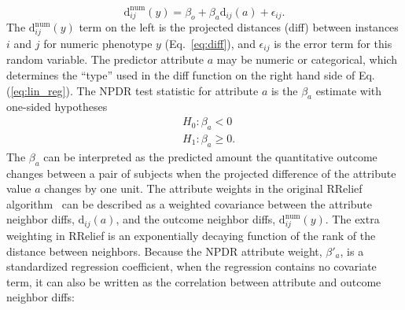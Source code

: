 \documentclass[10pt]{article}
\begin{document}

%
%
\begin{equation}\label{eq:lin_reg}
    \text{d}^{\text{num}}_{ij}(y) = \beta_{o} + \beta_{a} \text{d}_{ij}(a) + \epsilon_{ij}.
\end{equation}
The $\text{d}^{\text{num}}_{ij}(y)$ term on the left is the projected distances (diff) between instances $i$ and $j$ for numeric phenotype $y$ (Eq.~\ref{eq:diff}), and $\epsilon_{ij}$ is the error term for this random variable. The predictor attribute $a$ may be numeric or categorical, which determines the ``type'' used in the diff function on the right hand side of Eq.(\ref{eq:lin_reg}). The NPDR test statistic for attribute $a$ is the $\beta_a$ estimate with one-sided hypotheses
\begin{equation}\label{eq:linreg_null}
\begin{aligned}
    & H_0: \beta_a < 0 \\
    & H_1: \beta_a \ge 0.
\end{aligned}
\end{equation}
The $\beta_a$ can be interpreted as the predicted amount the quantitative outcome changes between a pair of subjects when the projected difference of the attribute value $a$ changes by one unit. The attribute weights in the original RRelief algorithm~\cite{robnik2003theoretical} can be described as a weighted covariance between the attribute neighbor diffs, $\text{d}_{ij}(a)$, and the outcome neighbor diffs, $\text{d}^{\text{num}}_{ij}(y)$. The extra weighting in RRelief is an exponentially decaying function of the rank of the distance between neighbors. Because the NPDR attribute weight, $\beta'_a$, is a standardized regression coefficient, when the regression contains no covariate term, it can also be written as the correlation between attribute and outcome neighbor diffs:
\end{document}
